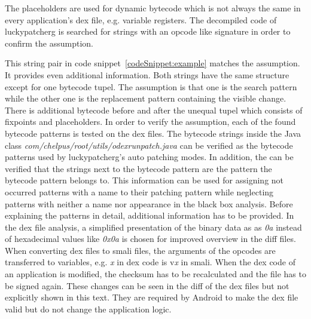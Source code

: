 The placeholders are used for dynamic bytecode which is not always the same in every application’s \gls{dex} file, e.g. variable registers.
\newline
The decompiled code of \gls{luckypatcherg} is searched for strings with an opcode like signature in order to confirm the assumption.
\newline

This string pair in code snippet~\ref{codeSnippet:example} matches the assumption.
It provides even additional information.
Both strings have the same structure except for one bytecode tupel.
The assumption is that one is the search pattern while the other one is the replacement pattern containing the visible change.
There is additional bytecode before and after the unequal tupel which consists of fixpoints and placeholders.
\newline
In order to verify the assumption, each of the found bytecode patterns is tested on the \gls{dex} files.
The bytecode strings inside the Java class \textit{com/chelpus/root/utils/odexrunpatch.java} can be verified as the bytecode patterns used by \gls{luckypatcherg}’s auto patching modes.
In addition, the can be verified that the strings next to the bytecode pattern are the pattern the bytecode pattern belongs to.
This information can be used for assigning not occurred patterns with a name to their patching pattern while neglecting patterns with neither a name nor appearance in the black box analysis.
\newline
\newline
Before explaining the patterns in detail, additional information has to be provided.
In the \gls{dex} file analysis, a simplified presentation of the binary data as as \textit{0a} instead of hexadecimal values like \textit{0x0a} is chosen for improved overview in the diff files.
When converting \gls{dex} files to smali files, the arguments of the opcodes are transferred to variables, e.g. \textit{x} in dex code is v\textit{x} in smali.
\newline
\newline
When the dex code of an application is modified, the checksum has to be recalculated and the file has to be signed again.
These changes can be seen in the diff of the dex files but not explicitly shown in this text.
They are required by Android to make the \gls{dex} file valid but do not change the application logic.

